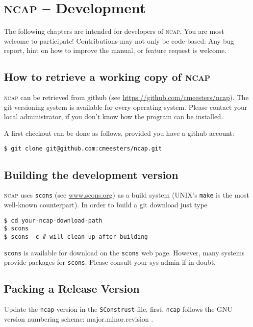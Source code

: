 \chapter[Development]{\textsc{ncap} -- Development}

The following chapters are intended for developers of \textsc{ncap}. You are most welcome to participate! Contributions may not only be code-based: Any bug report, hint on how to improve the manual, or feature request is welcome.

\section{How to retrieve a working copy of \textsc{ncap}}

\textsc{ncap} can be retrieved from github (see \url{https://github.com/cmeesters/ncap}). The git versioning system is available for every operating system. Please contact your local administrator, if you don't know how the program can be installed.

A first checkout can be done as follows, provided you have a github account:

\begin{lstlisting}[style=shell]
$ git clone git@github.com:cmeesters/ncap.git
\end{lstlisting}

\section{Building the development version}
\textsc{ncap} uses \texttt{scons} (see \url{www.scons.org}) as a build system (UNIX's \texttt{make} is the most well-known counterpart). In order to build a git download just type
\begin{lstlisting}[style=shell]
$ cd your-ncap-download-path
$ scons
$ scons -c # will clean up after building
\end{lstlisting}
\texttt{scons} is available for download on the \texttt{scons} web page. However, many systems provide packages for \texttt{scons}. Please consult your sys-admin if in doubt.

\section{Packing a Release Version}
\alert{Update the \texttt{ncap} version in the \texttt{SConstrust}-file, first. \texttt{ncap} follows the GNU version numbering scheme: major.minor.revision .}

